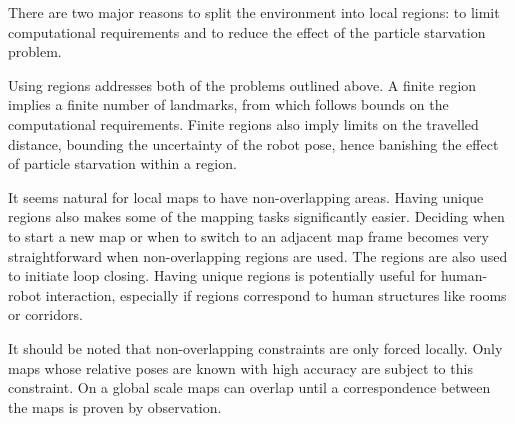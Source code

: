 There are two major reasons to split the environment into local
regions: to limit computational requirements and to reduce the effect
of the particle starvation problem.

Using regions addresses both of the problems outlined above. A finite
region implies a finite number of landmarks, from which follows bounds
on the computational requirements. Finite regions also imply limits on
the travelled distance, bounding the uncertainty of the robot pose,
hence banishing the effect of particle starvation within a region.

It seems natural for local maps to have non-overlapping areas. Having
unique regions also makes some of the mapping tasks significantly
easier. Deciding when to start a new map or when to switch to an
adjacent map frame becomes very straightforward when non-overlapping
regions are used. The regions are also used to initiate loop
closing. Having unique regions is potentially useful for human-robot
interaction, especially if regions correspond to human structures
like rooms or corridors.

It should be noted that non-overlapping constraints are only forced
locally. Only maps whose relative poses are known with high accuracy
are subject to this constraint. On a global scale maps can overlap
until a correspondence between the maps is proven by observation.


